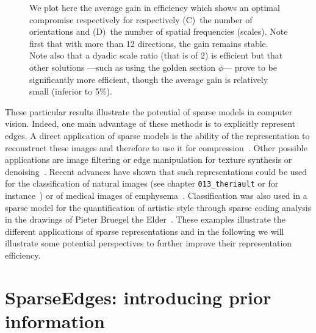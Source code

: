 \documentclass[a4paper, 11pt]{book}
\begin{document}
\begin{figure}
{We plot here the average gain in efficiency which shows an optimal compromise respectively for respectively \textsf{(C)}~the number of orientations and \textsf{(D)}~the number of spatial frequencies (scales). Note first that with more than 12 directions, the gain remains stable. Note also that a dyadic scale ratio (that is of 2) is efficient but that other solutions ---such as using the golden section $\phi$--- prove to be significantly more efficient, though the average gain is relatively small (inferior to 5\%).
\label{fig:efficiency}}%
\end{figure}%

These particular results illustrate the potential of sparse models in computer vision.
Indeed, one main advantage of these methods is to explicitly represent edges.
A direct application of sparse models is the ability of the representation to reconstruct these images and therefore to use it for compression~\citep{Perrinet03ieee}.
Other possible applications are image filtering or edge manipulation for texture synthesis or denoising~\citep{Portilla00}.
Recent advances have shown that such representations could be used for the classification of natural images (see chapter \verb+013_theriault+ or for instance~\citep{PerrinetBednar15}) or of medical images of emphysema~\citep{Nava13}.
Classification was also used in a sparse model
for the quantification of artistic style through sparse coding analysis
in the drawings of Pieter Bruegel the Elder~\citep{Hughes10}.
These examples illustrate the different applications of sparse representations and in the following we will illustrate some potential perspectives to further improve their representation efficiency.
%
\section{SparseEdges: introducing prior information}
\label{sec:sparseedges}
\end{document}
